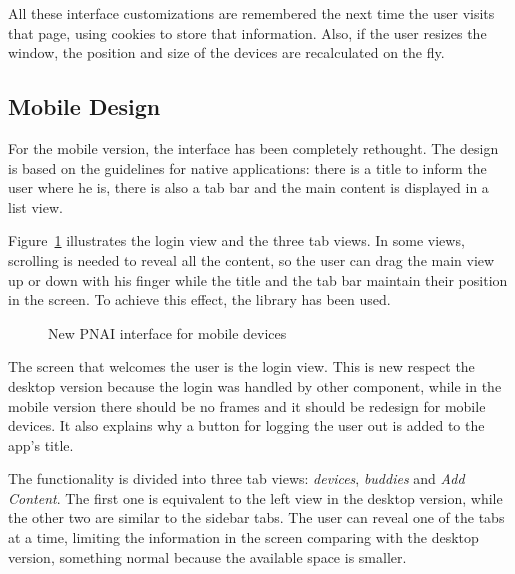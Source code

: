 All these interface customizations are remembered the next time the user visits that page, using cookies to store that information.
Also, if the user resizes the window, the position and size of the devices are recalculated on the fly.


\subsection{Mobile Design} %
\label{sub:mobile_design}

For the mobile version, the interface has been completely rethought.
The design is based on the  guidelines for native applications: there is a title to inform the user where he is, there is also a tab bar and the main content is displayed in a list view.

Figure~\ref{fig:pnai-mobile} illustrates the login view and the three tab views.
In some views, scrolling is needed to reveal all the content, so the user can drag the main view up or down with his finger while the title and the tab bar maintain their position in the screen.
To achieve this effect, the  library has been used.

\begin{figure}[htbp]
  \centering
  \caption{New PNAI interface for mobile devices}
  \label{fig:pnai-mobile}
\end{figure}

The screen that welcomes the user is the login view.
This is new respect the desktop version because the login was handled by other component, while in the mobile version there should be no frames and it should be redesign for mobile devices.
It also explains why a button for logging the user out is added to the app's title.

The functionality is divided into three tab views: \emph{devices}, \emph{buddies} and \emph{Add Content}.
The first one is equivalent to the left view in the desktop version, while the other two are similar to the sidebar tabs.
The user can reveal one of the tabs at a time, limiting the information in the screen comparing with the desktop version, something normal because the available space is smaller.

